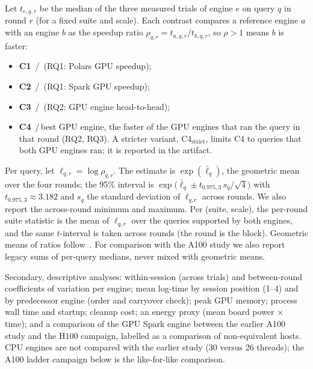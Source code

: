 \documentclass[11pt]{article}
\begin{document}
Let $t_{e,q,r}$ be the median of the three measured trials of engine $e$ on
query $q$ in round $r$ (for a fixed suite and scale). Each contrast compares a
reference engine $a$ with an engine $b$ as the speedup ratio
$\rho_{q,r} = t_{a,q,r} / t_{b,q,r}$, so $\rho > 1$ means $b$ is faster:
\begin{itemize}[leftmargin=*,itemsep=1pt]
  \item \textbf{C1} \polarscpu{}\,/\,\polarsgpu{} (RQ1: Polars GPU speedup);
  \item \textbf{C2} \sparkcpu{}\,/\,\sparkgpu{} (RQ1: Spark GPU speedup);
  \item \textbf{C3} \sparkgpu{}\,/\,\polarsgpu{} (RQ2: GPU engine head-to-head);
  \item \textbf{C4} \polarscpu{}\,/\,best GPU engine, the faster of the
    GPU engines that ran the query in that round (RQ2, RQ3). A stricter
    variant, C4$_\text{strict}$, limits C4 to queries that both GPU engines
    ran; it is reported in the artifact.
\end{itemize}
Per query, let $\ell_{q,r} = \log \rho_{q,r}$. The estimate is
$\exp(\bar\ell_q)$, the geometric mean over the four rounds; the 95\%
interval is $\exp\!\bigl(\bar\ell_q \pm t_{0.975,3}\, s_q / \sqrt{4}\bigr)$
with $t_{0.975,3} \approx 3.182$ and $s_q$ the standard deviation of
$\ell_{q,r}$ across rounds. We also report the across-round minimum and
maximum. Per (suite, scale), the per-round suite statistic is the mean of
$\ell_{q,r}$ over the queries supported by both engines, and the same
$t$-interval is taken across rounds (the round is the block). Geometric means
of ratios follow~\citet{fleming1986geomean}. For comparison with the A100 study
we also report legacy sums of per-query medians, never mixed with geometric
means.

Secondary, descriptive analyses: within-session (across trials) and
between-round coefficients of variation per engine; mean log-time by session
position (1--4) and by predecessor engine (order and carryover check); peak GPU
memory; process wall time and startup; cleanup cost; an energy proxy (mean
board power $\times$ time); and a comparison of the GPU Spark engine between
the earlier A100 study and the H100 campaign, labelled as a comparison of
non-equivalent hosts. CPU engines are not compared with the earlier study
(30 versus 26 threads); the A100 ladder campaign below is the like-for-like
comparison.
\end{document}
